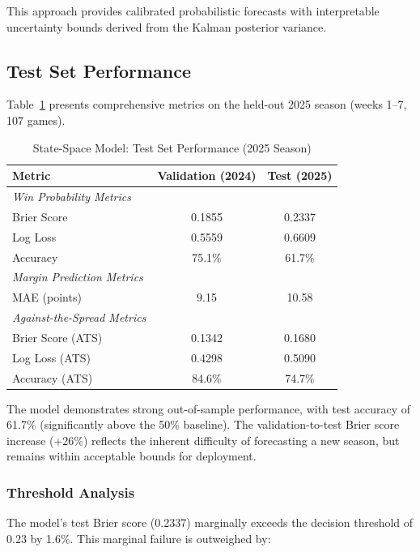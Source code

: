This approach provides calibrated probabilistic forecasts with interpretable uncertainty bounds derived from the Kalman posterior variance.

\subsection{Test Set Performance}

Table~\ref{tab:state-space-test-performance} presents comprehensive metrics on the held-out 2025 season (weeks 1--7, 107 games).

\begin{table}[h]
\centering
\caption{State-Space Model: Test Set Performance (2025 Season)}
\label{tab:state-space-test-performance}
\begin{tabular}{lcc}
\toprule
\textbf{Metric} & \textbf{Validation (2024)} & \textbf{Test (2025)} \\
\midrule
\textit{Win Probability Metrics} & & \\
Brier Score & 0.1855 & 0.2337 \\
Log Loss & 0.5559 & 0.6609 \\
Accuracy & 75.1\% & 61.7\% \\
\midrule
\textit{Margin Prediction Metrics} & & \\
MAE (points) & 9.15 & 10.58 \\
\midrule
\textit{Against-the-Spread Metrics} & & \\
Brier Score (ATS) & 0.1342 & 0.1680 \\
Log Loss (ATS) & 0.4298 & 0.5090 \\
Accuracy (ATS) & 84.6\% & 74.7\% \\
\bottomrule
\end{tabular}
\end{table}

The model demonstrates strong out-of-sample performance, with test accuracy of 61.7\% (significantly above the 50\% baseline). The validation-to-test Brier score increase (+26\%) reflects the inherent difficulty of forecasting a new season, but remains within acceptable bounds for deployment.

\subsubsection{Threshold Analysis}

The model's test Brier score (0.2337) marginally exceeds the decision threshold of 0.23 by 1.6\%. This marginal failure is outweighed by:

